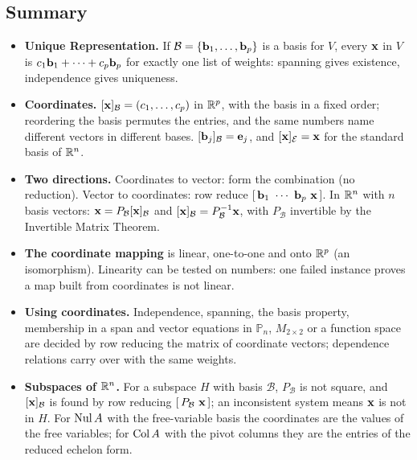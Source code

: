 \documentclass[11pt]{article}
\begin{document}
\subsection*{Summary}
\begin{itemize}
  \item \textbf{Unique Representation.} If $\mathcal{B}=\{\mathbf{b}_1,\dots,\mathbf{b}_p\}$ is a basis for $V$, every $\mathbf{x}$ in $V$ is $c_1\mathbf{b}_1+\cdots+c_p\mathbf{b}_p$ for exactly one list of weights: spanning gives existence, independence gives uniqueness.
  \item \textbf{Coordinates.} $[\mathbf{x}]_{\mathcal{B}}=(c_1,\dots,c_p)$ in $\mathbb{R}^p$, with the basis in a fixed order; reordering the basis permutes the entries, and the same numbers name different vectors in different bases. $[\mathbf{b}_j]_{\mathcal{B}}=\mathbf{e}_j$, and $[\mathbf{x}]_{\mathcal{E}}=\mathbf{x}$ for the standard basis of $\mathbb{R}^n$.
  \item \textbf{Two directions.} Coordinates to vector: form the combination (no reduction). Vector to coordinates: row reduce $[\,\mathbf{b}_1\ \cdots\ \mathbf{b}_p\ \mathbf{x}\,]$. In $\mathbb{R}^n$ with $n$ basis vectors: $\mathbf{x}=P_{\mathcal{B}}[\mathbf{x}]_{\mathcal{B}}$ and $[\mathbf{x}]_{\mathcal{B}}=P_{\mathcal{B}}^{-1}\mathbf{x}$, with $P_{\mathcal{B}}$ invertible by the Invertible Matrix Theorem.
  \item \textbf{The coordinate mapping} is linear, one-to-one and onto $\mathbb{R}^p$ (an isomorphism). Linearity can be tested on numbers: one failed instance proves a map built from coordinates is not linear.
  \item \textbf{Using coordinates.} Independence, spanning, the basis property, membership in a span and vector equations in $\mathbb{P}_n$, $M_{2\times2}$ or a function space are decided by row reducing the matrix of coordinate vectors; dependence relations carry over with the same weights.
  \item \textbf{Subspaces of $\mathbb{R}^n$.} For a subspace $H$ with basis $\mathcal{B}$, $P_{\mathcal{B}}$ is not square, and $[\mathbf{x}]_{\mathcal{B}}$ is found by row reducing $[\,P_{\mathcal{B}}\ \bv{x}\,]$; an inconsistent system means $\mathbf{x}$ is not in $H$. For $\operatorname{Nul} A$ with the free-variable basis the coordinates are the values of the free variables; for $\operatorname{Col} A$ with the pivot columns they are the entries of the reduced echelon form.
\end{itemize}
\end{document}
